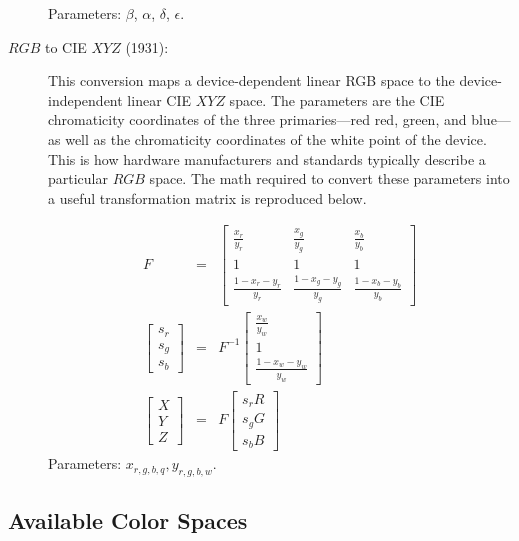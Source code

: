 \documentclass[11pt,letterpaper]{article}
\begin{document}
\begin{description}
Parameters: $\beta$, $\alpha$, $\delta$, $\epsilon$.

\item[$RGB$ to CIE $XYZ$ (1931):]
\vspace{\baselineskip}\hfill

This conversion maps a device-dependent linear RGB space to the
 device-independent linear CIE $XYZ$ space.
The parameters are the CIE chromaticity coordinates of the three
 primaries---red red, green, and blue---as well as the chromaticity coordinates
 of the white point of the device.
This is how hardware manufacturers and standards typically describe a
 particular $RGB$ space.
The math required to convert these parameters into a useful transformation
 matrix is reproduced below.

\begin{eqnarray*}
F                  & = &
\left[\begin{array}{ccc}
\frac{x_r}{y_r}       & \frac{x_g}{y_g}       & \frac{x_b}{y_b}       \\
1                     & 1                     & 1                     \\
\frac{1-x_r-y_r}{y_r} & \frac{1-x_g-y_g}{y_g} & \frac{1-x_b-y_b}{y_b}
\end{array}\right] \\
\left[\begin{array}{c}
s_r \\
s_g \\
s_b
\end{array}\right] & = &
F^{-1}\left[\begin{array}{c}
\frac{x_w}{y_w} \\
1 \\
\frac{1-x_w-y_w}{y_w}
\end{array}\right] \\
\left[\begin{array}{c}
X \\
Y \\
Z
\end{array}\right] & = &
F\left[\begin{array}{c}
s_rR \\
s_gG \\
s_bB
\end{array}\right]
\end{eqnarray*}
Parameters: $x_{r,g,b,q},y_{r,g,b,w}$.

\end{description}

\subsection{Available Color Spaces}
\label{sec:colorspaces}
\end{document}
